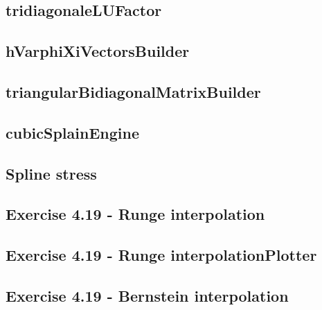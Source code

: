 \subsection{tridiagonaleLUFactor}
\label{subsec:tridiagonaleLUFactor}


\subsection{hVarphiXiVectorsBuilder}
\label{subsec:hVarphiXiVectorsBuilder}


\subsection{triangularBidiagonalMatrixBuilder}
\label{subsec:triangularBidiagonalMatrixBuilder}


\subsection{cubicSplainEngine}
\label{subsec:cubicSplainEngine}


\subsection{Spline stress}
\label{subsec:splineStress}


\subsection{Exercise 4.19 - Runge interpolation}
\label{subsec:exercise419RungeInterpolation}


\subsection{Exercise 4.19 - Runge interpolationPlotter}
\label{subsec:exercise419RungeInterpolationPlotter}


\subsection{Exercise 4.19 - Bernstein interpolation}
\label{subsec:exercise419BernsteinInterpolation}


